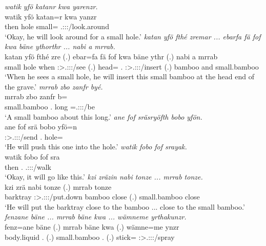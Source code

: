 \begin{exe}
	\emph{watik yfö katanr kwa yarenzr.}\\
	\gll watik yfö katan=r kwa yanzr\\
	then hole small=\Purp{} \Fut{} \Tsg.\Masc:\Sbj:\Nonpast:\Ipfv/look.around\\
	\trans `Okay, he will look around for a small hole.'
	\emph{katan yfö fthé zremar ... ebarfa fä fof kwa bäne ythorthr ... nabi a mrrab.}\\
	\gll katan yfö fthé zre (.) ebar=fa fä fof kwa bäne ythr (.) nabi a mrrab\\
	small hole when \Stsg:\Sbj>\Tsg.\F:\Obj:\Irr:\Pfv/see (.) head=\Abl{} \Dist{} \Emph{} \Fut{} \Recog.\Abs{} \Stsg:\Sbj>\Tsg.\Masc:\Obj:\Nonpast:\Ipfv/insert (.) bamboo and small.bamboo\\
	\trans `When he sees a small hole, he will insert this small bamboo at the head end of the grave.'
	\emph{mrrab zbo zanfr byé.}\\
	\gll mrrab zbo zanfr b=\\
	small.bamboo{} \Prox.\All{} long \Med=\Tsg.\Masc:\Sbj:\Nonpast:\Ipfv/be\\
	\trans `A small bamboo about this long.'
	\emph{ane fof sräsryöfth bobo yfön.}\\
	\gll ane fof srä bobo yfö=n\\
	\Dem{} \Emph{} \Stsg:\Sbj>\Tsg.\Masc:\Obj:\Irr:\Pfv/send \Med.\All{} hole=\Loc\\
	\trans `He will push this one into the hole.'
	\emph{watik fobo fof srayak.}\\
	\gll watik fobo fof sra\\
	then \Dist.\All{} \Emph{} \Tsg.\Masc:\Sbj:\Irr:\Ipfv/walk\\
	\trans `Okay, it will go like this.'
	\emph{kzi zräzin nabi tonze ... mrrab tonze.}\\
	\gll kzi zrä nabi tonze (.) mrrab tonze\\
	barktray \Stsg:\Sbj>\Tsg.\F:\Obj:\Irr:\Pfv/put.down bamboo close (.) small.bamboo close\\
	\trans `He will put the barktray close to the bamboo ... close to the small bamboo.'
	\emph{fenzane bäne ... mrrab bäne kwa ... wämneme yrthakunzr.}\\
	\gll fenz=ane bäne (.) mrrab bäne kwa (.) wämne=me ynzr\\
	body.liquid \Recog.\Abs{} (.) small.bamboo \Recog.\Abs{} \Fut{} (.) stick=\Ins{} \Stsg:\Sbj>\Tsg.\Masc:\Obj:\Nonpast:\Ipfv/spray\\

\end{exe}
